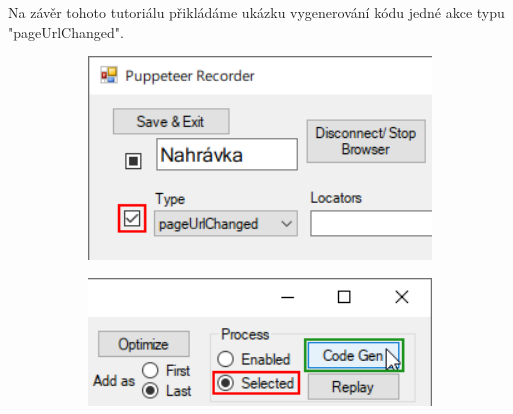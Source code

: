 \documentclass[12pt, a4paper, twoside]{article}
\begin{document}
	Na závěr tohoto tutoriálu přikládáme ukázku vygenerování kódu jedné akce typu "pageUrlChanged". 
	\begin{figure}[H]
		\begin{minipage}{0.47\textwidth}
			\begin{subfigure}[t]{1.0\textwidth}
				\includegraphics[width=1.0\textwidth]{actionSelected.png}
			\end{subfigure}
		\end{minipage}
		\hfill
		\textrightarrow
		\hfill
		\begin{minipage}{0.47\textwidth}
			\begin{subfigure}[t]{1.0\textwidth}
				\includegraphics[width=1.0\textwidth, right]{codeGenSelected.png}
			\end{subfigure}
		\end{minipage}
	\end{figure}
	\vspace{-1.0cm}
	\begin{figure}[H]\ContinuedFloat
		\hfill
		\begin{minipage}{0.205\textwidth}
			\begin{turn}{45}
				\textleftarrow
			\end{turn}
		\end{minipage}
	\end{figure}
\end{document}
